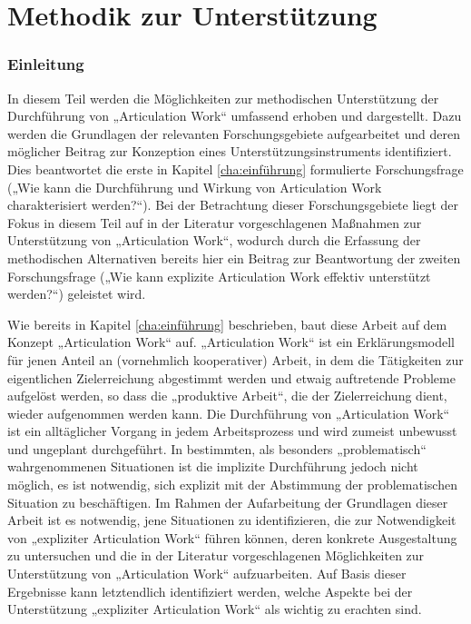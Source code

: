 \part{Methodik zur Unterstützung} %
\label{prt:grundlagen}

\section*{Einleitung} %
\label{sec:grundlagen_einleitung}


In diesem Teil werden die Möglichkeiten zur methodischen Unterstützung der Durchführung von „Articulation Work“ umfassend erhoben und dargestellt. Dazu werden die Grundlagen der relevanten Forschungsgebiete aufgearbeitet und deren möglicher Beitrag zur Konzeption eines Unterstützungsinstruments identifiziert. Dies beantwortet die erste in Kapitel \ref{cha:einführung} formulierte Forschungsfrage („Wie kann die Durchführung und Wirkung von Articulation Work charakterisiert werden?“). Bei der Betrachtung dieser Forschungsgebiete liegt der Fokus in diesem Teil auf in der Literatur vorgeschlagenen Maßnahmen zur Unterstützung von „Articulation Work“, wodurch durch die Erfassung der methodischen Alternativen bereits hier ein Beitrag zur Beantwortung der zweiten Forschungsfrage („Wie kann explizite Articulation Work effektiv unterstützt werden?“) geleistet wird.

Wie bereits in Kapitel \ref{cha:einführung} beschrieben, baut diese Arbeit auf dem Konzept „Articulation Work“ auf. „Articulation Work“ ist ein Erklärungsmodell für jenen Anteil an (vornehmlich kooperativer) Arbeit, in dem die Tätigkeiten zur eigentlichen Zielerreichung abgestimmt werden und etwaig auftretende Probleme aufgelöst werden, so dass die „produktive Arbeit“, die der Zielerreichung dient, wieder aufgenommen werden kann. Die Durchführung von „Articulation Work“ ist ein alltäglicher Vorgang in jedem Arbeitsprozess und wird zumeist unbewusst und ungeplant durchgeführt. In bestimmten, als besonders „problematisch“ wahrgenommenen Situationen ist die implizite Durchführung jedoch nicht  möglich, es ist notwendig, sich explizit mit der Abstimmung der problematischen Situation zu beschäftigen. Im Rahmen der Aufarbeitung der Grundlagen dieser Arbeit ist es notwendig, jene Situationen zu identifizieren, die zur Notwendigkeit von „expliziter Articulation Work“ führen können, deren konkrete Ausgestaltung zu untersuchen und die in der Literatur vorgeschlagenen Möglichkeiten zur Unterstützung von „Articulation Work“ aufzuarbeiten. Auf Basis dieser Ergebnisse kann letztendlich identifiziert werden, welche Aspekte bei der Unterstützung „expliziter Articulation Work“ als wichtig zu erachten sind.

